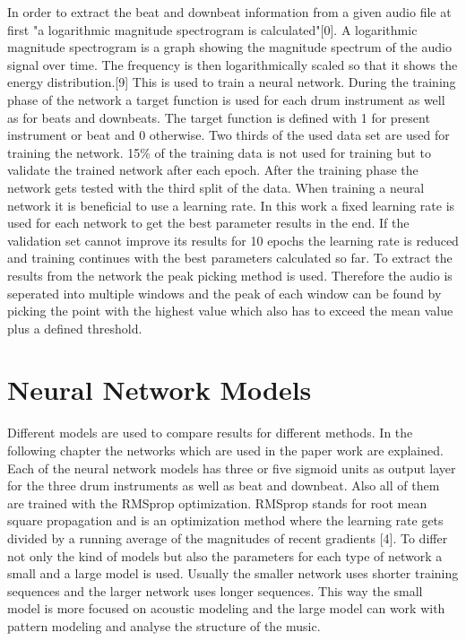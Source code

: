 \documentclass[11pt,twocolumn]{article}
\begin{document}
In order to extract the beat and downbeat information from a given audio file at first "a logarithmic magnitude spectrogram is calculated"[0].\newline
A logarithmic magnitude spectrogram is a graph showing the magnitude spectrum of the audio signal over time. The frequency is then logarithmically scaled so that it shows the energy distribution.[9]\newline
This is used to train a neural network. During the training phase of the network a target function is used for each drum instrument as well as for beats and downbeats. The target function is defined with 1 for present instrument or beat and 0 otherwise. Two thirds of the used data set are used for training the network. 15\% of the training data is not used for training but to validate the trained network after each epoch. After the training phase the network gets tested with the third split of the data. When training a neural network it is beneficial to use a learning rate. In this work a fixed learning rate is used for each network to get the best parameter results in the end. If the validation set cannot improve its results for 10 epochs the learning rate is reduced and training continues with the best parameters calculated so far.\newline
To extract the results from the network the peak picking method is used. Therefore the audio is seperated into multiple windows and the peak of each window can be found by picking the point with the highest value which also has to exceed the mean value plus a defined threshold. 

\section*{Neural Network Models}

Different models are used to compare results for different methods. In the following chapter the networks which are used in the paper work are explained. Each of the neural network models has three or five sigmoid units as output layer for the three drum instruments as well as beat and downbeat. Also all of them are trained with the RMSprop optimization. RMSprop stands for root mean square propagation and is an optimization method where the learning rate gets divided by a running average of the magnitudes of recent gradients [4].\newline
To differ not only the kind of models but also the parameters for each type of network a small and a large model is used. Usually the smaller network uses shorter training sequences and the larger network uses longer sequences. This way the small model is more focused on acoustic modeling and the large model can work with pattern modeling and analyse the structure of the music. 
\end{document}
